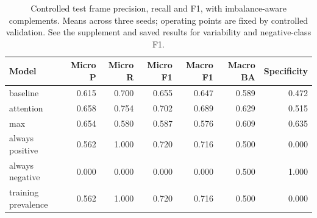 \begin{table}[H]\centering\small
\caption{Controlled test frame precision, recall and F1, with imbalance-aware complements. Means across three seeds; operating points are fixed by controlled validation. See the supplement and saved results for variability and negative-class F1.}\label{tab:controlled}
\begin{tabular}{lrrrrrr}\toprule
Model & Micro P & Micro R & Micro F1 & Macro F1 & Macro BA & Specificity \\\midrule
baseline & 0.615 & 0.700 & 0.655 & 0.647 & 0.589 & 0.472 \\
attention & 0.658 & 0.754 & 0.702 & 0.689 & 0.629 & 0.515 \\
max & 0.654 & 0.580 & 0.587 & 0.576 & 0.609 & 0.635 \\
always positive & 0.562 & 1.000 & 0.720 & 0.716 & 0.500 & 0.000 \\
always negative & 0.000 & 0.000 & 0.000 & 0.000 & 0.500 & 1.000 \\
training prevalence & 0.562 & 1.000 & 0.720 & 0.716 & 0.500 & 0.000 \\
\bottomrule\end{tabular}\end{table}